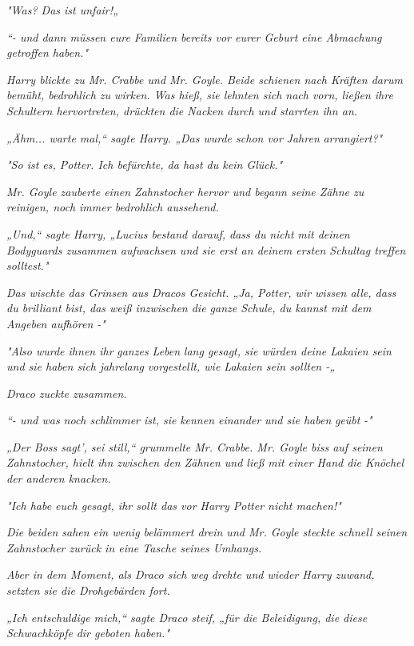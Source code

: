 {\emph{"Was? Das ist unfair!„}

\emph{“- und dann müssen eure Familien bereits vor eurer Geburt eine Abmachung getroffen haben."}

\emph{Harry blickte zu Mr. Crabbe und Mr. Goyle. Beide schienen nach Kräften darum bemüht, bedrohlich zu wirken. Was hieß, sie lehnten sich nach vorn, ließen ihre Schultern hervortreten, drückten die Nacken durch und starrten ihn an.}

\emph{„Ähm... warte mal,“ sagte Harry. „Das wurde schon vor} \emph{\emph{Jahren}} \emph{arrangiert?"}

\emph{"So ist es, Potter. Ich befürchte, da hast du kein Glück."}

\emph{Mr. Goyle zauberte einen Zahnstocher hervor und begann seine Zähne zu reinigen, noch immer bedrohlich aussehend.}

\emph{„Und,“ sagte Harry, „Lucius bestand darauf, dass du} \emph{\emph{nicht}} \emph{mit deinen Bodyguards zusammen aufwachsen und sie erst an deinem ersten Schultag treffen solltest."}

\emph{Das wischte das Grinsen aus Dracos Gesicht. „Ja, Potter, wir wissen alle, dass du brilliant bist, das weiß inzwischen die ganze Schule, du kannst mit dem Angeben aufhören -"}

\emph{"Also wurde ihnen ihr} \emph{\emph{ganzes Leben}} \emph{lang gesagt, sie würden deine Lakaien sein und sie haben sich} \emph{\emph{jahrelang}} \emph{vorgestellt, wie Lakaien sein sollten -„}

\emph{Draco zuckte zusammen.}

\emph{“- und was noch schlimmer ist, sie} \emph{\emph{kennen einander}} \emph{und sie haben} \emph{\emph{geübt}} \emph{-"}

\emph{„Der Boss sagt', sei still,“ grummelte Mr. Crabbe. Mr. Goyle biss auf seinen Zahnstocher, hielt ihn zwischen den Zähnen und ließ mit einer Hand die Knöchel der anderen knacken.}

\emph{"\emph{Ich habe euch gesagt, ihr sollt das vor Harry Potter nicht machen!}"}

\emph{Die beiden sahen ein wenig belämmert drein und Mr. Goyle steckte schnell seinen Zahnstocher zurück in eine Tasche seines Umhangs.}

\emph{Aber in dem Moment, als Draco sich weg drehte und wieder Harry zuwand, setzten sie die Drohgebärden fort.}

\emph{„Ich entschuldige mich,“ sagte Draco steif, „für die Beleidigung, die diese} \emph{\emph{Schwachköpfe}} \emph{dir geboten haben."}

}
